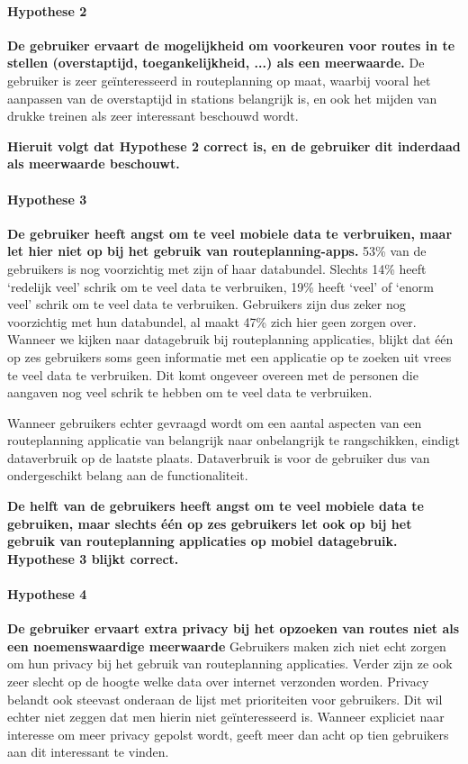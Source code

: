 \paragraph{Hypothese 2}\textbf{De gebruiker ervaart de mogelijkheid om voorkeuren voor routes in te stellen (overstaptijd, toegankelijkheid, ...) als een meerwaarde.}
	De gebruiker is zeer geïnteresseerd in routeplanning op maat, waarbij vooral het aanpassen van de overstaptijd in stations belangrijk is, en ook het mijden van drukke treinen als zeer interessant beschouwd wordt.

\textbf{Hieruit volgt dat Hypothese 2 correct is, en de gebruiker dit inderdaad als meerwaarde beschouwt. }	

\paragraph{Hypothese 3}\textbf{ De gebruiker heeft angst om te veel mobiele data te verbruiken, maar let hier niet op bij het gebruik van routeplanning-apps.}
    53\% van de gebruikers is nog voorzichtig met zijn of haar databundel. Slechts 14\% heeft `redelijk veel' schrik om te veel data te verbruiken, 19\% heeft `veel' of `enorm veel' schrik om te veel data te verbruiken. Gebruikers zijn dus zeker nog voorzichtig met hun databundel, al maakt 47\% zich hier geen zorgen over.
    Wanneer we kijken naar datagebruik bij routeplanning applicaties, blijkt dat één op zes gebruikers soms geen informatie met een applicatie op te zoeken uit vrees te veel data te verbruiken. Dit komt ongeveer overeen met de personen die aangaven nog veel schrik te hebben om te veel data te verbruiken.
    
    Wanneer gebruikers echter gevraagd wordt om een aantal aspecten van een routeplanning applicatie van belangrijk naar onbelangrijk te rangschikken, eindigt dataverbruik op de laatste plaats. Dataverbruik is voor de gebruiker dus van ondergeschikt belang aan de functionaliteit.
    
\textbf{De helft van de gebruikers heeft angst om te veel mobiele data te gebruiken, maar slechts één op zes gebruikers let ook op bij het gebruik van routeplanning applicaties op mobiel datagebruik. Hypothese 3 blijkt correct.}

\paragraph{Hypothese 4}\textbf{De gebruiker ervaart extra privacy bij het opzoeken van routes niet als een noemenswaardige meerwaarde}
	Gebruikers maken zich niet echt zorgen om hun privacy bij het gebruik van routeplanning applicaties. Verder zijn ze ook zeer slecht op de hoogte welke data over internet verzonden worden. Privacy belandt ook steevast onderaan de lijst met prioriteiten voor gebruikers. Dit wil echter niet zeggen dat men hierin niet geïnteresseerd is. Wanneer expliciet naar interesse om meer privacy gepolst wordt, geeft meer dan acht op tien gebruikers aan dit interessant te vinden.
	
